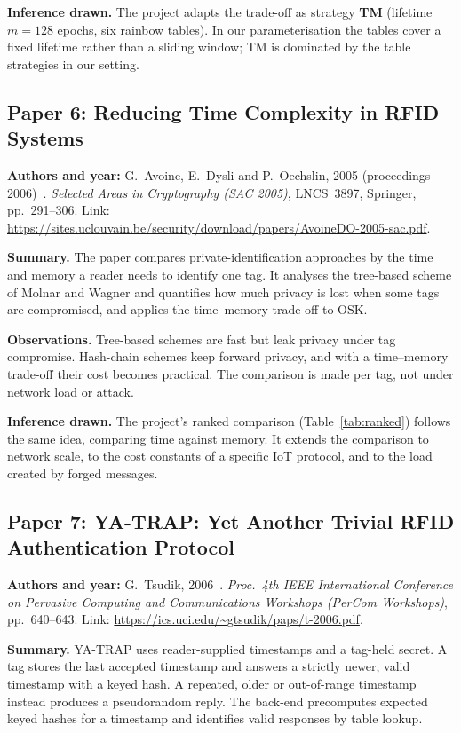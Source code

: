 \textbf{Inference drawn.} The project adapts the trade-off as strategy \textbf{TM} (lifetime $m=128$ epochs, six rainbow tables). In our parameterisation the tables cover a fixed lifetime rather than a sliding window; TM is dominated by the table strategies in our setting.

\subsection*{Paper 6: Reducing Time Complexity in RFID Systems}
\textbf{Authors and year:} G.~Avoine, E.~Dysli and P.~Oechslin, 2005 (proceedings 2006)~\cite{ado05}. \emph{Selected Areas in Cryptography (SAC 2005)}, LNCS~3897, Springer, pp.~291--306. Link: \url{https://sites.uclouvain.be/security/download/papers/AvoineDO-2005-sac.pdf}.

\textbf{Summary.} The paper compares private-identification approaches by the time and memory a reader needs to identify one tag. It analyses the tree-based scheme of Molnar and Wagner and quantifies how much privacy is lost when some tags are compromised, and applies the time--memory trade-off to OSK.

\textbf{Observations.} Tree-based schemes are fast but leak privacy under tag compromise. Hash-chain schemes keep forward privacy, and with a time--memory trade-off their cost becomes practical. The comparison is made per tag, not under network load or attack.

\textbf{Inference drawn.} The project's ranked comparison (Table~\ref{tab:ranked}) follows the same idea, comparing time against memory. It extends the comparison to network scale, to the cost constants of a specific IoT protocol, and to the load created by forged messages.

\subsection*{Paper 7: YA-TRAP: Yet Another Trivial RFID Authentication Protocol}
\textbf{Authors and year:} G.~Tsudik, 2006~\cite{tsudik}. \emph{Proc.\ 4th IEEE International Conference on Pervasive Computing and Communications Workshops (PerCom Workshops)}, pp.~640--643. Link: \url{https://ics.uci.edu/~gtsudik/paps/t-2006.pdf}.

\textbf{Summary.} YA-TRAP uses reader-supplied timestamps and a tag-held secret. A tag stores the last accepted timestamp and answers a strictly newer, valid timestamp with a keyed hash. A repeated, older or out-of-range timestamp instead produces a pseudorandom reply. The back-end precomputes expected keyed hashes for a timestamp and identifies valid responses by table lookup.

